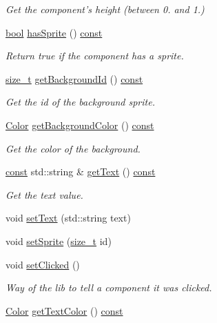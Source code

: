 \begin{DoxyCompactItemize}
\begin{DoxyCompactList}\small\item\em Get the component's height (between 0. and 1.) \end{DoxyCompactList}\item 
\hyperlink{term__entry_8h_a002004ba5d663f149f6c38064926abac}{bool} \hyperlink{classarcade_1_1_component_a40eb04e4e977e1771c789742025f762c}{has\-Sprite} () \hyperlink{term__entry_8h_a57bd63ce7f9a353488880e3de6692d5a}{const} 
\begin{DoxyCompactList}\small\item\em Return true if the component has a sprite. \end{DoxyCompactList}\item 
\hyperlink{nc__alloc_8h_a7b60c5629e55e8ec87a4547dd4abced4}{size\-\_\-t} \hyperlink{classarcade_1_1_component_a7cc1f16412a28dc4e54462e7aca481b0}{get\-Background\-Id} () \hyperlink{term__entry_8h_a57bd63ce7f9a353488880e3de6692d5a}{const} 
\begin{DoxyCompactList}\small\item\em Get the id of the background sprite. \end{DoxyCompactList}\item 
\hyperlink{unionarcade_1_1_color}{Color} \hyperlink{classarcade_1_1_component_afc1b1ddd8abec154f63f88ff2d1fb5f6}{get\-Background\-Color} () \hyperlink{term__entry_8h_a57bd63ce7f9a353488880e3de6692d5a}{const} 
\begin{DoxyCompactList}\small\item\em Get the color of the background. \end{DoxyCompactList}\item 
\hyperlink{term__entry_8h_a57bd63ce7f9a353488880e3de6692d5a}{const} std\-::string \& \hyperlink{classarcade_1_1_component_a1fe2450277a4f37a7625b0b3deb7a75d}{get\-Text} () \hyperlink{term__entry_8h_a57bd63ce7f9a353488880e3de6692d5a}{const} 
\begin{DoxyCompactList}\small\item\em Get the text value. \end{DoxyCompactList}\item 
void \hyperlink{classarcade_1_1_component_acbe88607acaa6930ba468ea808a983ca}{set\-Text} (std\-::string text)
\item 
void \hyperlink{classarcade_1_1_component_a9aea3bdc9243734b0adf62bd4374fd6e}{set\-Sprite} (\hyperlink{nc__alloc_8h_a7b60c5629e55e8ec87a4547dd4abced4}{size\-\_\-t} id)
\item 
void \hyperlink{classarcade_1_1_component_add191bdc12082bbc7a4d575e6400bf73}{set\-Clicked} ()
\begin{DoxyCompactList}\small\item\em Way of the lib to tell a component it was clicked. \end{DoxyCompactList}\item 
\hyperlink{unionarcade_1_1_color}{Color} \hyperlink{classarcade_1_1_component_ad8fc0212256aee804469f01035cd47f9}{get\-Text\-Color} () \hyperlink{term__entry_8h_a57bd63ce7f9a353488880e3de6692d5a}{const} 
\end{DoxyCompactItemize}


